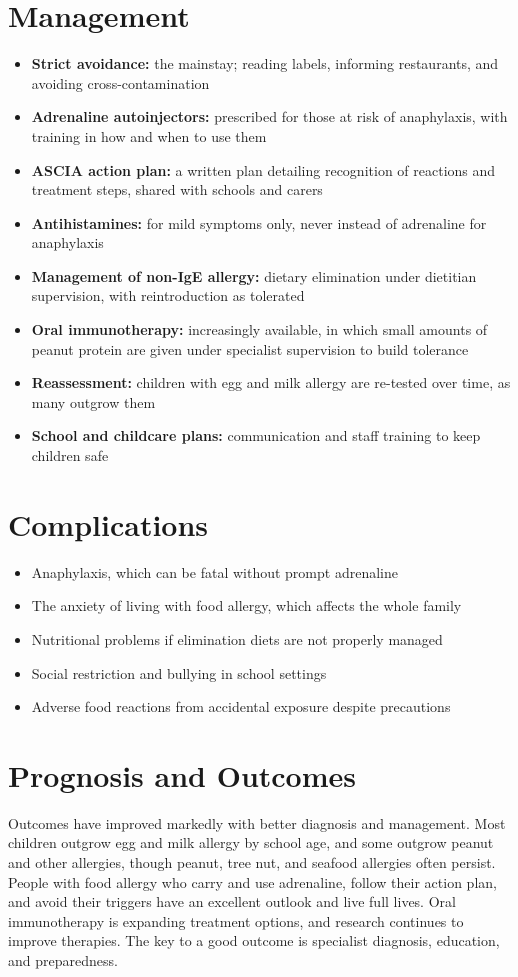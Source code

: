 \section*{Management}
\begin{itemize}
    \item \textbf{Strict avoidance:} the mainstay; reading labels, informing restaurants, and avoiding cross-contamination
    \item \textbf{Adrenaline autoinjectors:} prescribed for those at risk of anaphylaxis, with training in how and when to use them
    \item \textbf{ASCIA action plan:} a written plan detailing recognition of reactions and treatment steps, shared with schools and carers
    \item \textbf{Antihistamines:} for mild symptoms only, never instead of adrenaline for anaphylaxis
    \item \textbf{Management of non-IgE allergy:} dietary elimination under dietitian supervision, with reintroduction as tolerated
    \item \textbf{Oral immunotherapy:} increasingly available, in which small amounts of peanut protein are given under specialist supervision to build tolerance
    \item \textbf{Reassessment:} children with egg and milk allergy are re-tested over time, as many outgrow them
    \item \textbf{School and childcare plans:} communication and staff training to keep children safe
\end{itemize}

\section*{Complications}
\begin{itemize}
    \item Anaphylaxis, which can be fatal without prompt adrenaline
    \item The anxiety of living with food allergy, which affects the whole family
    \item Nutritional problems if elimination diets are not properly managed
    \item Social restriction and bullying in school settings
    \item Adverse food reactions from accidental exposure despite precautions
\end{itemize}

\section*{Prognosis and Outcomes}
Outcomes have improved markedly with better diagnosis and management. Most children outgrow egg and milk allergy by school age, and some outgrow peanut and other allergies, though peanut, tree nut, and seafood allergies often persist. People with food allergy who carry and use adrenaline, follow their action plan, and avoid their triggers have an excellent outlook and live full lives. Oral immunotherapy is expanding treatment options, and research continues to improve therapies. The key to a good outcome is specialist diagnosis, education, and preparedness.


